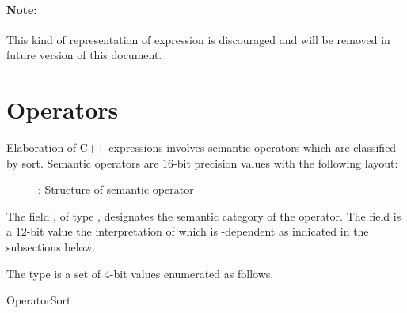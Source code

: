 
\paragraph{Note:} This kind of representation of expression is discouraged and will be removed in future version of this document.



\subsection{}
\label{sec:ifc:ExprSort:AssignInitializer}


\begin{figure}[H]
	\centering
\end{figure}


\section{Operators}
\label{sec:ifc-operators}

Elaboration of C++ expressions involves semantic operators which are classified
by sort. Semantic operators are $16$-bit precision values with the following
layout:
%
\begin{figure}[H]
	\centering
	  \begin{BasicAbstractReferenceLayout}{16}
	  \end{BasicAbstractReferenceLayout} 
	  \caption{: Structure of semantic operator}
	  \label{fig:ifc-semantic-operator}
\end{figure}
%

The field , of type , designates the semantic category
of the operator.  The field  is a $12$-bit value the 
interpretation of which is -dependent as indicated in the 
subsections below.

The type  is a set of $4$-bit values enumerated as follows.
\begin{Enumeration}{OperatorSort}
	
	\setcounter{enumi}{13}
\end{Enumeration}

